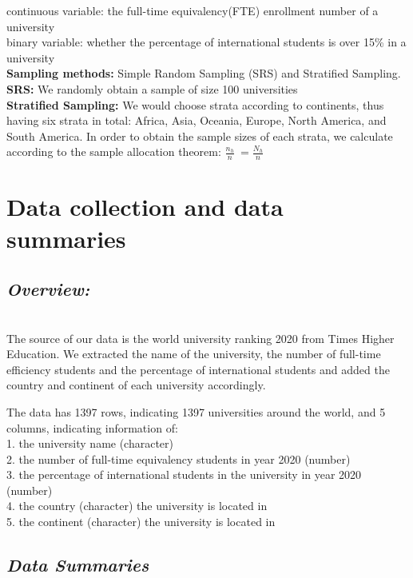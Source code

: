 \documentclass{article}
\begin{document}
\noindent continuous variable: the full-time equivalency(FTE) enrollment number of a university \\
binary variable: whether the percentage of international students is over 15\% in a university \\

\noindent\textbf{Sampling methods:} Simple Random Sampling (SRS) and Stratified Sampling. \\

\noindent\textbf{SRS:} We randomly obtain a sample of size 100 universities \\
\noindent\textbf{Stratified Sampling:} We would choose strata according to continents, thus having six strata in total:  Africa, Asia, Oceania, Europe, North America, and South America. In order to obtain the sample sizes of each strata, we calculate according to the sample allocation theorem:
$ \frac{n_h}{n}\ = \frac{N_h}{n}\ $ \\
\newpage
\section{Data collection and data summaries}
\subsection{{\textbf{\textit{Overview:}}}}\\
The source of our data is the world university ranking 2020 from Times Higher Education. We extracted the name of the university, the number of full-time efficiency students and the percentage of international students and added the country and continent of each university accordingly. 

\noindent  The data has 1397 rows, indicating 1397 universities around the world, and 5 columns, indicating information of:\\
    1. the university name (character)\\
    2. the number of full-time equivalency students in year 2020 (number)\\
    3. the percentage of international students in the university in year 2020 (number)\\
    4. the country (character) the university is located in\\
    5. the continent (character) the university is located in\\
    
\subsection{{\textbf{\textit{Data Summaries}}}}\\
\end{document}
